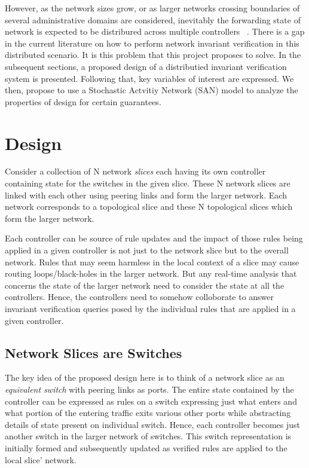 \documentclass[a4paper,10pt]{article}
\begin{document}
However, as the network sizes grow, or as larger networks crossing boundaries of several administrative domains are considered, inevitably the forwarding state of network is expected to be distribured across multiple controllers ~\cite{tcpp}. There is a gap in the current literature on how to perform network invariant verification in this distributed scenario. It is this problem that this project proposes to solve. In the subsequent sections, a proposed design of a distributied invariant verification system is presented. Following that, key variables of interest are expressed. We then, propose to use a Stochastic Actvitiy Network (SAN) model to analyze the properties of design for certain guarantees.

\section{Design}

Consider a collection of N network \textit{slices} each having its own controller containing state for the switches in the given slice. These N network slices are linked with each other using peering links and form the larger network. Each network corresponds to a topological slice and these N topological slices which form the larger network. 

Each controller can be source of rule updates and the impact of those rules being applied in a given controller is not just to the network slice but to the overall network. Rules that may seem harmless in the local context of a slice may cause routing loops/black-holes in the larger network. But any real-time analysis that concerns the state of the larger network need to consider the state at all the controllers. Hence, the controllers need to somehow colloborate to answer invariant verification queries posed by the individual rules that are applied in a given controller.

\subsection{Network Slices are Switches}

The key idea of the proposed design here is to think of a network slice as an \textit{equivalent switch} with peering links as ports. The entire state contained by the controller can be expressed as rules on a switch expressing just what enters and what portion of the entering traffic exits various other ports while abstracting details of state present on individual switch. Hence, each controller becomes just another switch in the larger network of switches. This switch representation is initially formed and subsequently updated as verified rules are applied to the local slice' network.
\end{document}
